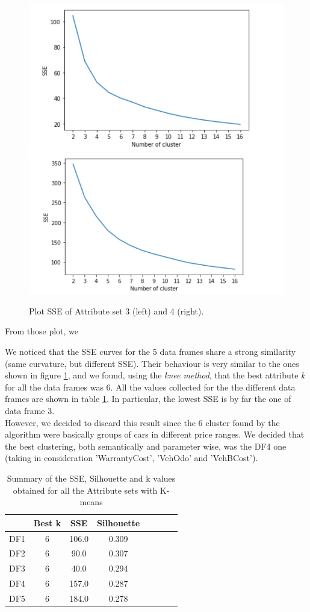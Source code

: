 \documentclass{article}
\begin{document}
\begin{figure}[H]
	\centering
	\includegraphics[width=.49\textwidth]{cattura}\hfill
	\includegraphics[width=.49\textwidth]{SSE2}\hfill
	\caption{Plot SSE of Attribute set 3 (left) and 4 (right).}
	\label{fig:KmeansSSE}
\end{figure}
From those plot, we 

We noticed that the SSE curves for the 5 data frames share a strong similarity (same curvature, but different SSE). Their behaviour is very similar to the ones shown in figure \ref{fig:KmeansSSE}, and we found, using the \emph{knee method}, that the best attribute \emph{k} for all the data frames was 6. All the values collected for the the different data frames are shown in table \ref{tab:SSESilu}. In particular, the lowest SSE is by far the one of data frame 3. \\However, we decided to discard this result since the 6 cluster found by the algorithm were basically groups of cars in different price ranges. We decided that the best clustering, both semantically and parameter wise, was the DF4 one (taking in consideration 'WarrantyCost', 'VehOdo' and 'VehBCost').

\begin{table}[H]
\centering
\begin{tabular}{c|ccccccc}
\hline
 &  Best k & SSE& Silhouette \\
\hline
\rowcolor{Gray}
DF1 & 6 & 106.0 & 0.309 \\
DF2 & 6 & 90.0 & 0.307  \\
\rowcolor{Gray}
DF3 & 6 & 40.0 & 0.294 \\
DF4 & 6 & 157.0 & 0.287  \\
\rowcolor{Gray}
DF5 & 6 & 184.0\textbf & 0.278 \\
    \end{tabular}
    	\caption{{ Summary of the SSE, Silhouette and k values obtained for all the Attribute sets with K-means}}
    \label{tab:SSESilu}
    \end{table}
\end{document}
